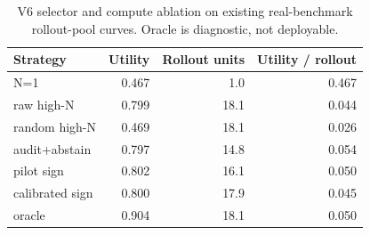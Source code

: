 \begin{table}[t]
\centering
\small
\begin{tabular}{lrrr}
\toprule
Strategy & Utility & Rollout units & Utility / rollout \\
\midrule
N=1 & 0.467 & 1.0 & 0.467 \\
raw high-N & 0.799 & 18.1 & 0.044 \\
random high-N & 0.469 & 18.1 & 0.026 \\
audit+abstain & 0.797 & 14.8 & 0.054 \\
pilot sign & 0.802 & 16.1 & 0.050 \\
calibrated sign & 0.800 & 17.9 & 0.045 \\
oracle & 0.904 & 18.1 & 0.050 \\
\bottomrule
\end{tabular}
\caption{V6 selector and compute ablation on existing real-benchmark rollout-pool curves. Oracle is diagnostic, not deployable.}
\label{tab:v6-ablation}
\end{table}
